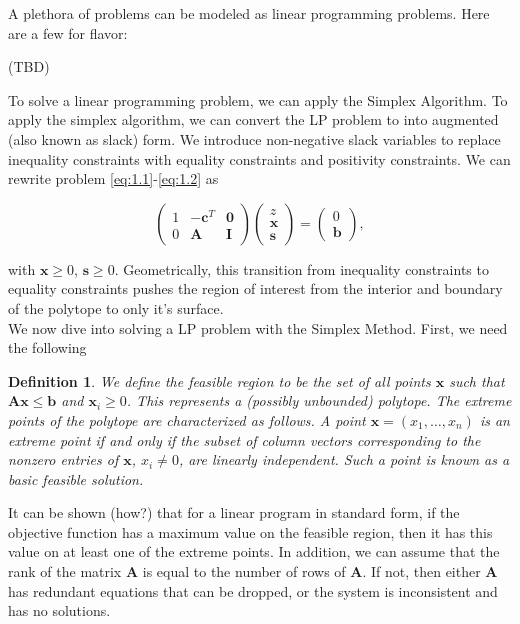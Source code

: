 \documentclass[12pt,english]{article}
\newtheorem{definition}[theorem]{Definition}
\begin{document}
A plethora of problems can be modeled as linear programming problems.  Here are a few for flavor:

(TBD)

To solve a linear programming problem, we can apply the Simplex Algorithm.   To apply the simplex algorithm, we can convert the LP problem to into augmented (also known as slack) form.  We introduce non-negative slack variables to replace inequality constraints with equality constraints and positivity constraints.   We can rewrite problem \eqref{eq:1.1}-\eqref{eq:1.2} as

\begin{equation}
\left(
\begin{array}{ccc}
1	&	-\mathbf{c}^T 	&	\mathbf{0} 	\\
0	&	\mathbf{A}		& 	\mathbf{I}
\end{array}
\right)
\left(
\begin{array}{c}
z \\
\mathbf{x} \\
\mathbf{s}
\end{array}
\right)
= 
\left(
\begin{array}{c}
0 \\
\mathbf{b}
\end{array}
\right),
\end{equation}

with $\mathbf{x} \geq 0$, $\mathbf{s} \geq 0$.  Geometrically, this transition from inequality constraints to equality constraints pushes the region of interest from the interior and boundary of the polytope to only it's surface.\\

We now dive into solving a LP problem with the Simplex Method.  First, we need the following

\begin{definition}\label{def:2.1}
We define the {\it feasible region} to be the set of all points $\mathbf{x}$ such that $\mathbf{A}\mathbf{x} \leq \mathbf{b}$ and $\mathbf{x}_i \geq 0$.  This represents a (possibly unbounded) polytope.  The extreme points of the polytope are characterized as follows.  A point $\mathbf{x} = (x_1, \dots, x_n)$ is an extreme point if and only if the subset of column vectors corresponding to the nonzero entries of $\mathbf{x}$, $x_i \neq 0$, are linearly independent.  Such a point is known as a basic feasible solution.
\end{definition}

It can be shown (how?) that for a linear program in standard form, if the objective function has a maximum value on the feasible region, then it has this value on at least one of the extreme points.   In addition, we can assume that the rank of the matrix $\mathbf{A}$ is equal to the number of rows of $\mathbf{A}$.  If not, then either $\mathbf{A}$ has redundant equations that can be dropped, or the system is inconsistent and has no solutions.\\
\end{document}
